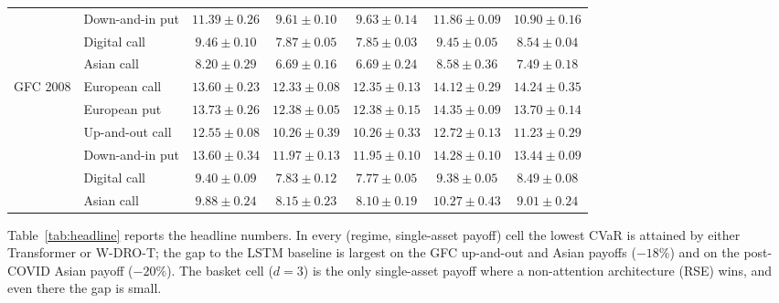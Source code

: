 \documentclass[11pt]{article}
\begin{document}
\begin{table}[t]
\begin{tabular}{llccccc}
 & Down-and-in put  & $11.39\pm0.26$ & $\mathbf{9.61\pm0.10}$   & $9.63\pm0.14$           & $11.86\pm0.09$ & $10.90\pm0.16$ \\
 & Digital call     & $9.46\pm0.10$  & $7.87\pm0.05$            & $\mathbf{7.85\pm0.03}$  & $9.45\pm0.05$  & $8.54\pm0.04$ \\
 & Asian call       & $8.20\pm0.29$  & $\mathbf{6.69\pm0.16}$   & $6.69\pm0.24$           & $8.58\pm0.36$  & $7.49\pm0.18$ \\\midrule
\multirow{6}{*}{GFC 2008}
 & European call    & $13.60\pm0.23$ & $\mathbf{12.33\pm0.08}$ & $12.35\pm0.13$ & $14.12\pm0.29$ & $14.24\pm0.35$ \\
 & European put     & $13.73\pm0.26$ & $\mathbf{12.38\pm0.05}$ & $12.38\pm0.15$ & $14.35\pm0.09$ & $13.70\pm0.14$ \\
 & Up-and-out call  & $12.55\pm0.08$ & $\mathbf{10.26\pm0.39}$ & $10.26\pm0.33$ & $12.72\pm0.13$ & $11.23\pm0.29$ \\
 & Down-and-in put  & $13.60\pm0.34$ & $11.97\pm0.13$           & $\mathbf{11.95\pm0.10}$ & $14.28\pm0.10$ & $13.44\pm0.09$ \\
 & Digital call     & $9.40\pm0.09$  & $7.83\pm0.12$            & $\mathbf{7.77\pm0.05}$  & $9.38\pm0.05$  & $8.49\pm0.08$ \\
 & Asian call       & $9.88\pm0.24$  & $8.15\pm0.23$            & $\mathbf{8.10\pm0.19}$  & $10.27\pm0.43$ & $9.01\pm0.24$ \\
\bottomrule
\end{tabular}
\end{table}

Table~\ref{tab:headline} reports the headline numbers.  In every (regime, single-asset payoff) cell the lowest CVaR is attained by either Transformer or W-DRO-T; the gap to the LSTM baseline is largest on the GFC up-and-out and Asian payoffs ($-18\%$) and on the post-COVID Asian payoff ($-20\%$).  The basket cell ($d=3$) is the only single-asset payoff where a non-attention architecture (RSE) wins, and even there the gap is small.
\end{document}
